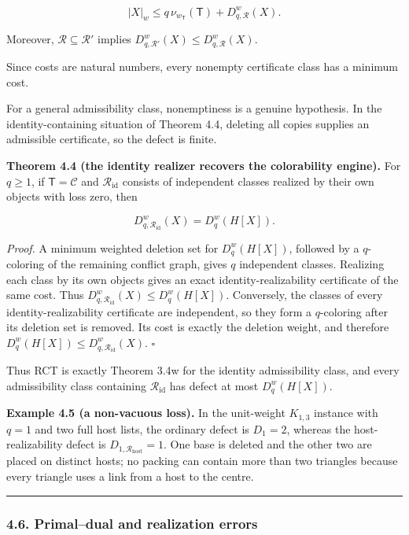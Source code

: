 \documentclass[english,11pt,a4paper]{article}
\newcounter{none}
\begin{document}
\[
|X|_w\le q\,\nu_{w_{\mathsf T}}(\mathsf T)+D^w_{q,\mathcal R}(X).
\]

Moreover, \(\mathcal R\subseteq\mathcal R'\) implies
\(D^w_{q,\mathcal R'}(X)\le D^w_{q,\mathcal R}(X)\).

Since costs are natural numbers, every nonempty certificate class has a
minimum cost.

For a general admissibility class, nonemptiness is a genuine hypothesis.
In the identity-containing situation of Theorem 4.4, deleting all copies
supplies an admissible certificate, so the defect is finite.

\textbf{Theorem 4.4 (the identity realizer recovers the colorability
engine).} For \(q\ge1\), if \(\mathsf T=\mathcal C\) and
\(\mathcal R_{\mathrm{id}}\) consists of independent classes realized by
their own objects with loss zero, then

\[
D^w_{q,\mathcal R_{\mathrm{id}}}(X)=D_q^w(H[X]).
\]

\emph{Proof.} A minimum weighted deletion set for \(D_q^w(H[X])\),
followed by a \(q\)-coloring of the remaining conflict graph, gives
\(q\) independent classes. Realizing each class by its own objects gives
an exact identity-realizability certificate of the same cost. Thus
\(D^w_{q,\mathcal R_{\mathrm{id}}}(X)\le D_q^w(H[X])\). Conversely, the
classes of every identity-realizability certificate are independent, so
they form a \(q\)-coloring after its deletion set is removed. Its cost
is exactly the deletion weight, and therefore
\(D_q^w(H[X])\le D^w_{q,\mathcal R_{\mathrm{id}}}(X)\). \(\square\)

Thus RCT is exactly Theorem 3.4w for the identity admissibility class,
and every admissibility class containing \(\mathcal R_{\mathrm{id}}\)
has defect at most \(D_q^w(H[X])\).

\textbf{Example 4.5 (a non-vacuous loss).} In the unit-weight
\(K_{1,3}\) instance with \(q=1\) and two full host lists, the ordinary
defect is \(D_1=2\), whereas the host-realizability defect is
\(D_{1,\mathcal R_{\mathrm{host}}}=1\). One base is deleted and the
other two are placed on distinct hosts; no packing can contain more than
two triangles because every triangle uses a link from a host to the
centre.

\begin{center}\rule{0.5\linewidth}{0.5pt}\end{center}

\subsubsection{4.6. Primal--dual and realization
errors}\label{primaldual-and-realization-errors}
\end{document}

